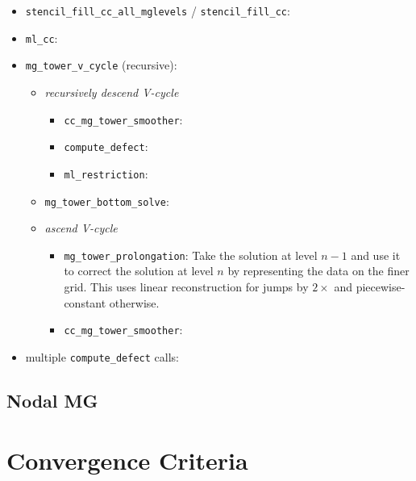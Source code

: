 \begin{itemize}

\item {\tt stencil\_fill\_cc\_all\_mglevels} / {\tt stencil\_fill\_cc}:

\item {\tt ml\_cc}:

\item {\tt mg\_tower\_v\_cycle} (recursive):
\begin{itemize}

  \item {\em recursively descend V-cycle}
  \begin{itemize} 
  \item {} {\tt cc\_mg\_tower\_smoother}:

  \item {\tt compute\_defect}:

  \item{} {\tt ml\_restriction}:
  \end{itemize}

  \item {\tt mg\_tower\_bottom\_solve}:

  \item {\em ascend V-cycle}
  \begin{itemize}
  \item{} {\tt mg\_tower\_prolongation}: Take the solution at level $n-1$ and use it to 
     correct the solution at level $n$ by representing the data on the finer grid.  This uses
     linear reconstruction for jumps by $2\times$ and piecewise-constant otherwise.

  \item{} {\tt cc\_mg\_tower\_smoother}:
  \end{itemize}

\end{itemize}
\item multiple {\tt compute\_defect} calls:


\end{itemize}



\subsection{Nodal MG}


\section{Convergence Criteria}


